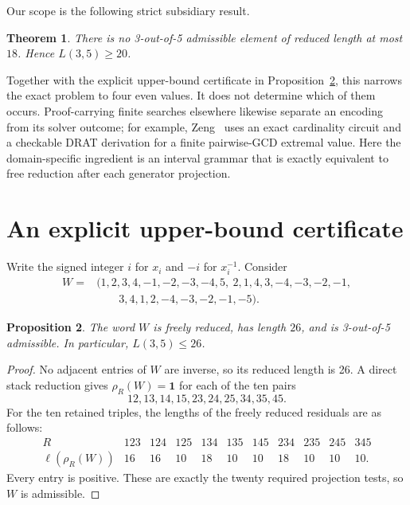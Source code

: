 \documentclass[11pt]{article}
\newtheorem{theorem}{Theorem}
\newtheorem{proposition}[theorem]{Proposition}
\begin{document}
Our scope is the following strict subsidiary result.

\begin{theorem}\label{thm:lower}
There is no 3-out-of-5 admissible element of reduced length at most \(18\).
Hence \(L(3,5)\geq20\).
\end{theorem}

Together with the explicit upper-bound certificate in
Proposition~\ref{prop:upper}, this narrows the exact problem to four even
values.  It does not determine which of them occurs.  Proof-carrying finite
searches elsewhere likewise separate an encoding from its solver outcome;
for example, Zeng~\cite{Zeng2026GCD} uses an exact cardinality circuit and a
checkable DRAT derivation for a finite pairwise-GCD extremal value.  Here the
domain-specific ingredient is an interval grammar that is exactly equivalent
to free reduction after each generator projection.

\section{An explicit upper-bound certificate}

Write the signed integer \(i\) for \(x_i\) and \(-i\) for \(x_i^{-1}\).
Consider
\begin{align*}
W={}&(1,2,3,4,-1,-2,-3,-4,5,\
       2,1,4,3,-4,-3,-2,-1,\\
    &\qquad 3,4,1,2,-4,-3,-2,-1,-5).
\end{align*}

\begin{proposition}\label{prop:upper}
The word \(W\) is freely reduced, has length \(26\), and is 3-out-of-5
admissible.  In particular, \(L(3,5)\leq26\).
\end{proposition}

\begin{proof}
No adjacent entries of \(W\) are inverse, so its reduced length is 26.
A direct stack reduction gives \(\rho_R(W)=\mathbf{1}\) for each of the ten pairs
\[
12,13,14,15,23,24,25,34,35,45.
\]
For the ten retained triples, the lengths of the freely reduced residuals are
as follows:
\[
\begin{array}{c|rrrrrrrrrr}
R&123&124&125&134&135&145&234&235&245&345\\ \hline
\ell(\rho_R(W))&16&16&10&18&10&10&18&10&10&10.
\end{array}
\]
Every entry is positive.  These are exactly the twenty required projection
tests, so \(W\) is admissible.
\end{proof}
\end{document}

